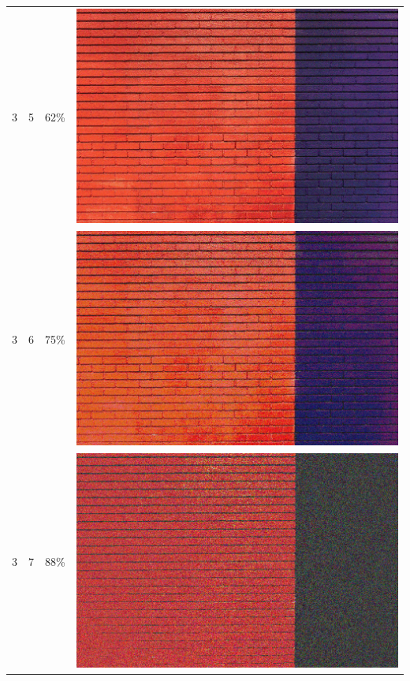 \documentclass[times, utf8, seminar]{fer}
\begin{document}
\begin{center}
\begin{longtable}{|c|c|c|c|}
3 & 5 &62\% & \includegraphics[scale=0.3]{../benchmark_results/pattern/3_components-5_bits.png} \\
3 & 6 &75\% & \includegraphics[scale=0.3]{../benchmark_results/pattern/3_components-6_bits.png} \\
3 & 7 &88\% & \includegraphics[scale=0.3]{../benchmark_results/pattern/3_components-7_bits.png} \\

\end{longtable}
\end{center}
\end{document}
